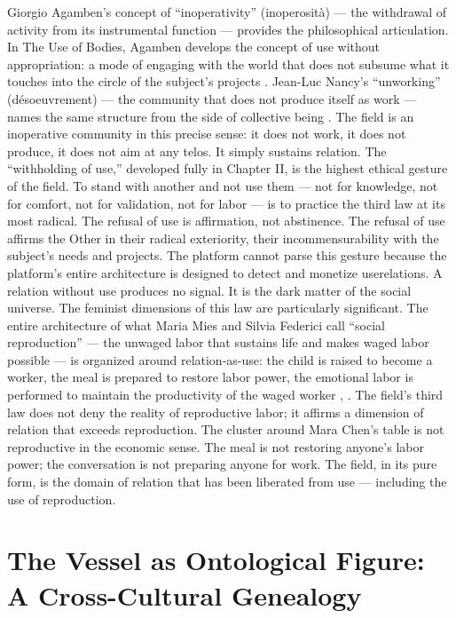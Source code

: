 Giorgio Agamben’s concept of “inoperativity” (inoperosità) — the withdrawal of activity from its instrumental function — provides the philosophical articulation. In The Use of Bodies, Agamben develops the concept of use without appropriation: a mode of engaging with the world that does not subsume what it touches into the circle of the subject’s projects \cite{agamben_2014}. Jean-Luc Nancy’s “unworking” (désoeuvrement) — the community that does not produce itself as work — names the same structure from the side of collective being \cite{nancy_1986}. The field is an inoperative community in this precise sense: it does not work, it does not produce, it does not aim at any telos. It simply sustains relation. The “withholding of use,” developed fully in Chapter II, is the highest ethical gesture of the field. To stand with another and not use them — not for knowledge, not for comfort, not for validation, not for labor — is to practice the third law at its most radical. The refusal of use is affirmation, not abstinence. The refusal of use affirms the Other in their radical exteriority, their incommensurability with the subject’s needs and projects. The platform cannot parse this gesture because the platform’s entire architecture is designed to detect and monetize userelations. A relation without use produces no signal. It is the dark matter of the social universe. The feminist dimensions of this law are particularly significant. The entire architecture of what Maria Mies and Silvia Federici call “social reproduction” — the unwaged labor that sustains life and makes waged labor possible — is organized around relation-as-use: the child is raised to become a worker, the meal is prepared to restore labor power, the emotional labor is performed to maintain the productivity of the waged worker \cite{federici_2004}, \cite{mies_1986}. The field’s third law does not deny the reality of reproductive labor; it affirms a dimension of relation that exceeds reproduction. The cluster around Mara Chen’s table is not reproductive in the economic sense. The meal is not restoring anyone’s labor power; the conversation is not preparing anyone for work. The field, in its pure form, is the domain of relation that has been liberated from use — including the use of reproduction.

\section{The Vessel as Ontological Figure: A Cross-Cultural Genealogy}

